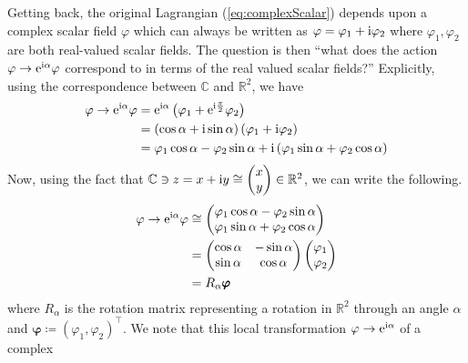 Getting back, the original Lagrangian (\ref{eq:complexScalar}) depends upon a
complex scalar field \(\varphi\) which can always be written as
\(\varphi = \varphi_1 + \mathrm{i}\varphi_2\) where \(\varphi_1, \varphi_2\) are both
real-valued scalar fields. The question is then ``what does the action
\(\varphi\to \mathrm{e}^{\mathrm{i}\alpha}\varphi\) correspond to in terms of the real valued
scalar fields?'' Explicitly, using the correspondence between \(\mathbb{C}\) and
\(\mathbb{R}^2\), we have
\begin{align*}
    \varphi \to \mathrm{e}^{\mathrm{i}\alpha}\varphi & = \mathrm{e}^{\mathrm{i}\alpha}\left(\varphi_1 + \mathrm{e}^{\mathrm{i}\frac{\pi}{2}}\varphi_2\right)                                         \\
                                      & = \left(\cos{\alpha} + \mathrm{i} \sin{\alpha}\right)\left(\varphi_1 + \mathrm{i}\varphi_2\right)                             \\
                                      & = \varphi_1\cos{\alpha} - \varphi_2\sin{\alpha} + \mathrm{i}\left(\varphi_1\sin{\alpha} + \varphi_2\cos{\alpha}\right)
\end{align*}
Now, using the fact that \(\mathbb{C}\ni z = x + \mathrm{i} y\cong \begin{pmatrix}x\\y\end{pmatrix}\in\mathbb{R}^2\),
we can write the following.
\begin{align*}
    \varphi\to\mathrm{e}^{\mathrm{i}\alpha}\varphi & \cong \begin{pmatrix} \varphi_1\cos{\alpha} - \varphi_2\sin{\alpha} \\ \varphi_1\sin{\alpha} + \varphi_2\cos{\alpha} \end{pmatrix}                       \\
                                    & = \begin{pmatrix} \cos{\alpha} & -\sin{\alpha} \\ \sin{\alpha} & \cos{\alpha} \end{pmatrix}\begin{pmatrix} \varphi_1 \\ \varphi_2 \end{pmatrix} \\
                                    & = R_\alpha\pmb{\varphi}
\end{align*}
where \(R_\alpha\) is the rotation matrix representing a rotation in
\(\mathbb{R}^2\) through an angle \(\alpha\) and \(\pmb{\varphi} \coloneqq (\varphi_1, \varphi_2)^\intercal\).
We note that this local transformation \(\varphi\to\mathrm{e}^{\mathrm{i}\alpha}\) of a complex

